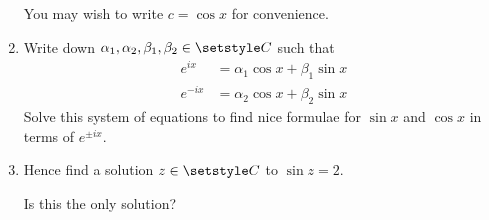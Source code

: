\begin{enumerate}
  You may wish to write \(c = \cos x\) for convenience.
 \item
  Write down \(\alpha_1, \alpha_2, \beta_1, \beta_2 \in \Complex\) such that
  \begin{align*}
   e^{ix} &= \alpha_1 \cos x + \beta_1 \sin x \\
   e^{-ix} &= \alpha_2 \cos x + \beta_2 \sin x
  \end{align*}
  Solve this system of equations to find nice formulae for
  \(\sin x\) and \(\cos x\) in terms of \(e^{\pm ix}\).
 \item
  Hence find a solution \(z \in \Complex\) to \(\sin z = 2\).

  Is this the only solution?
\end{enumerate}
